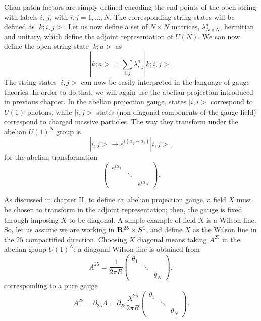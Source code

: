 Chan-paton factors are simply defined encoding the end points of
the open string with labels $i$, $j$, with $i,j=1,\ldots,N$. The
corresponding string states will be defined as $|k;i,j>$. Let us
now define a set of $N \times N$ matrices, $\lambda^{a}_{N \times
N}$, hermitian and unitary, which define the adjoint
representation of $U(N)$. We can now define the open string state
$|k;a>$ as
\begin{equation}
|k;a> = \sum_{i,j} \lambda^{a}_{i,j} |k;i,j>.
\label{eq:III41}
\end{equation}
The string states $|i,j>$ can now be easily interpreted in the
language of gauge theories. In order to do that, we will again
use the abelian projection introduced in previous chapter. In
the abelian projection gauge, states $|i,i>$ correspond to $U(1)$
photons, while $|i,j>$ states (non diagonal components of the
gauge field) correspond to charged massive particles. The way
they transform under the abelian $U(1)^N$ group is
\begin{equation}
|i,j> \rightarrow e^{i(\alpha_j-\alpha_i)}|i,j>,
\label{eq:III42}
\end{equation}
for the abelian transformation
\begin{equation}
	\left( \begin{array}{ccc} e^{i\alpha_1} &   &  \\
					  & \ddots &   \\
				       &  &   e^{i\alpha_N}
		\end{array} \right).
\label{eq:III43}
\end{equation}
  
As discussed in chapter II, to define an abelian projection
gauge, a field $X$ must be chosen to transform in the adjoint
representation; then, the gauge is fixed through imposing $X$ to
be diagonal. A simple example of field $X$ is a Wilson line. So,
let us assume we are working in ${\bf R}^{25} \times S^1$, and
define $X$ as the Wilson line in the $25$ compactified direction.
Choosing $X$ diagonal means taking $A^{25}$ in the abelian group
$U(1)^N$; a diagonal Wilson line is obtained from
\begin{equation}
A^{25} = \frac {1}{2 \pi R} \left( \begin{array}{ccc} \theta_1 &   &  \\
						  &  \ddots &   \\
						  &  &  \theta_N
		\end{array} \right),
\label{eq:III44}
\end{equation}
corresponding to a pure gauge
\begin{equation}
A^{25} = \partial_{25} \Lambda = \partial_{25} \frac {X^{25}}{2
\pi R} \left( \begin{array}{ccc} \theta_1 &  &   \\
						    & \ddots &    \\
						    &  &  \theta_N
		\end{array} \right).
\label{eq:III45}
\end{equation}
  
